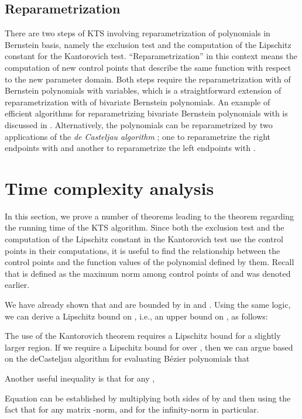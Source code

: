 \documentclass{article}
\newcommand\eref[1]{}
\begin{document}
\subsection{Reparametrization}
\label{sec:reparam}

There are two steps of KTS involving reparametrization of
polynomials in Bernstein basis, namely the exclusion test and the
computation of the Lipschitz constant for the Kantorovich test.
``Reparametrization'' in this context means the computation of new
control points that describe the same function with respect
to the new parameter domain.
Both steps require the reparametrization with  of
Bernstein polynomials with  variables, which is a
straightforward extension of reparametrization with  of
bivariate Bernstein polynomials.  An example of efficient 
algorithms for reparametrizing bivariate Bernstein polynomials with  is discussed in \cite{srijuntongsiri_basis}.  Alternatively, the polynomials can be reparametrized by two applications of the \emph{de Casteljau algorithm} \cite{patrikalakis}; one to reparametrize the right endpoints with  and another to reparametrize the left endpoints with .

\section{Time complexity analysis}
\label{section_analysis}

In this section, we prove a number of theorems leading to the
theorem regarding the running time of the KTS algorithm. Since
both the exclusion test and the computation of the Lipschitz
constant in the Kantorovich test use the control points in their
computations, it is useful to find the relationship between the
control points and the function values of the polynomial defined
by them. Recall that  is defined as the maximum norm among
control points of  and was denoted  earlier.

We have already shown that  and  are bounded
by  in 
\eref{eq:fMbound} and \eref{eq:fpMbound}.
Using the same logic, we can derive
a Lipschitz bound on , i.e., an upper bound on
, as follows:


The use of the Kantorovich theorem requires a Lipschitz bound
for a slightly larger region.  If we require a Lipschitz bound for
 over , then we can argue based on the
deCasteljau algorithm for evaluating B\'ezier polynomials that


Another useful inequality is that for any ,

Equation \eref{eq:Mpinvineq} can be established
by multiplying both sides of \eref{eq:fpMbound}
by   and then using
the fact that
 for any
matrix -norm, and for the infinity-norm in particular.
\end{document}
